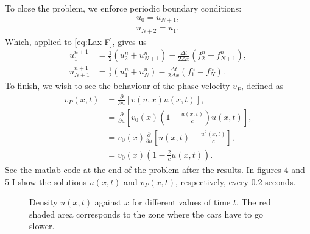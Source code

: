 \begin{questions}
\begin{solution}
To close the problem, we enforce periodic boundary conditions:
\begin{align*}
u_0 = u_{N+1},\\
u_{N+2} = u_1.
\end{align*}
Which, applied to \eqref{eq:Lax-F}, gives us
\begin{align}\label{eq:Lax-F}
u_1^{n+1} &= \frac{1}{2}\left(u_{2}^n+u_{N+1}^n\right)-\frac{\Delta t}{2\Delta x}\left(f_{2}^n-f_{N+1}^n\right),\\
u_{N+1}^{n+1} &= \frac{1}{2}\left(u_{1}^n+u_{N}^n\right)-\frac{\Delta t}{2\Delta x}\left(f_{1}^n-f_{N}^n\right).
\end{align}
To finish, we wish to see the behaviour of the phase velocity $v_P$, defined as
\begin{align}
v_P(x,t) &= \frac{\partial}{\partial u}\left[v(u,x)u(x,t)\right],\\
&= \frac{\partial}{\partial u}\left[v_0(x)\left(1 - \frac{u(x,t)}{c}\right)
u(x,t)\right],\\
&= v_0(x)\frac{\partial}{\partial u}\left[u(x,t) - \frac{u^2(x,t)}{c}\right],\\
&= v_0(x)\left(1 - \frac{2}{c}u(x,t)\right).
\end{align}
See the matlab code at the end of the problem after the results. In figures 4 and 5 I show the solutions $u(x,t)$ and $v_P(x,t)$, respectively, every $0.2$ seconds.


\newpage
\begin{figure}[H]
\centering     %
{}
\hspace{-0.9cm}
\hspace{-0.9cm}
\hspace{-0.9cm}
\hspace{-0.9cm}
\hspace{-0.9cm}
\hspace{-0.9cm}
\caption{Density $u(x,t)$ against $x$ for different values of time $t$. The red shaded area corresponds to the zone where the cars have to go slower.} 
\end{figure}


\end{solution}
\end{questions}
